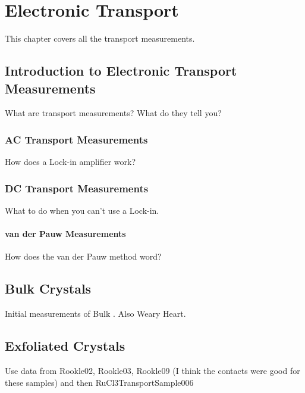 \chapter{Electronic Transport}
This chapter covers all the transport measurements.

\section{Introduction to Electronic Transport Measurements}

What are transport measurements? What do they tell you?

\subsection{AC Transport Measurements}

How does a Lock-in amplifier work?

\subsection{DC Transport Measurements}

What to do when you can't use a Lock-in.

\subsubsection{van der Pauw Measurements}

How does the van der Pauw method word?

\section{\rucl Bulk Crystals}

Initial measurements of Bulk \ruclnospace . Also Weary Heart.

\section{Exfoliated \rucl Crystals}

Use data from Rookle02, Rookle03, Rookle09 (I think the contacts were good for these samples) and then RuCl3TransportSample006